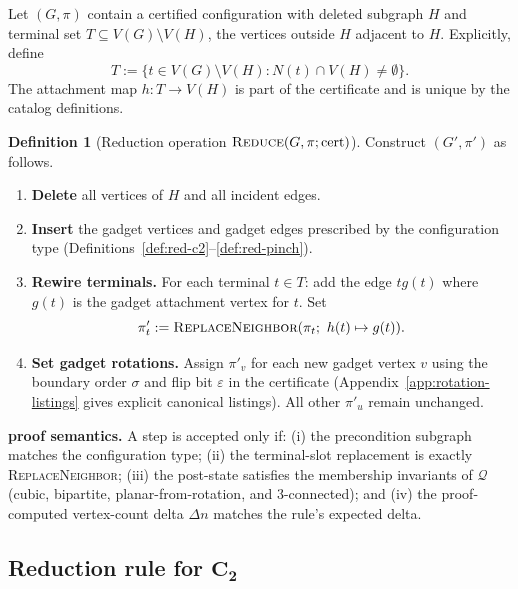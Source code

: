 \documentclass[12pt]{article}
\theoremstyle{definition}
\newtheorem{definition}[theorem]{Definition}
\begin{document}
Let $(G,\pi)$ contain a certified configuration with deleted subgraph $H$ and
terminal set $T \subseteq V(G)\setminus V(H)$, the vertices outside $H$ adjacent to $H$.
Explicitly, define
\[
  T := \{ t \in V(G)\setminus V(H) : N(t) \cap V(H) \neq \emptyset \}.
\]
The attachment map $h:T\to V(H)$ is part of the certificate and is unique by the catalog definitions.

\begin{definition}[Reduction operation $\textsc{Reduce}(G,\pi;\mathrm{cert})$]
\label{def:reduce-op}
Construct $(G',\pi')$ as follows.
\begin{enumerate}
  \item \textbf{Delete} all vertices of $H$ and all incident edges.
  \item \textbf{Insert} the gadget vertices and gadget edges prescribed by the
        configuration type (Definitions~\ref{def:red-c2}--\ref{def:red-pinch}).
  \item \textbf{Rewire terminals.} For each terminal $t\in T$:
        add the edge $t g(t)$ where $g(t)$ is the gadget attachment vertex for $t$.
        Set
        \[
          \pi'_t := \textsc{ReplaceNeighbor}(\pi_t;\ h(t)\mapsto g(t)).
        \]
  \item \textbf{Set gadget rotations.} Assign $\pi'_v$ for each new gadget
        vertex $v$ using the boundary order $\sigma$ and flip bit $\varepsilon$ in the certificate
        (Appendix~\ref{app:rotation-listings} gives explicit canonical listings).
        All other $\pi'_u$ remain unchanged.
\end{enumerate}
\end{definition}

\medskip
\noindent\textbf{proof semantics.}
A step is accepted only if:
(i) the precondition subgraph matches the configuration type;
(ii) the terminal-slot replacement is exactly \textsc{ReplaceNeighbor};
(iii) the post-state satisfies the membership invariants of $\mathcal{Q}$ (cubic, bipartite, planar-from-rotation, and $3$-connected); and
(iv) the proof-computed vertex-count delta $\Delta n$ matches the rule's expected delta.
\par

\subsection{Reduction rule for \texorpdfstring{$\mathbf{C_2}$}{C2}}
\label{subsec:red-c2}
\end{document}
